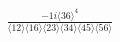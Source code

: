 \documentclass[varwidth, border=5pt]{standalone}
\begin{document}
\begin{my}
$\begin{gathered}
\scriptscriptstyle\frac{-1i⟨36⟩^4}{⟨12⟩⟨16⟩⟨23⟩⟨34⟩⟨45⟩⟨56⟩}
\end{gathered}$
\end{my}
\end{document}
